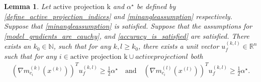 \documentclass{article}
\newtheorem{lemma}[theorem]{Lemma}
\theoremstyle{case}
\numberwithin{theorem}{subsection}
\newcommand{\gmcik}{{\nabla m_{c_i}^{(k)}\left(\xk\right)}}
\newcommand{\gmcil}{{\nabla m_{c_i}^{(l)}\left(\xl\right)}}
\newcommand{\minanglealpha}{{ \alpha^{\star} }}
\newcommand{\naturals}{\mathbb N}
\newcommand{\Rn}{\mathbb R^n}
\newcommand{\xk}{x^{(k)}}
\newcommand{\xl}{{x^{(l)}}}
\newcommand{\activeprojk}{{\textrm{active projection k}}}
\newcommand{\activeprojl}{{active projection l}}
\begin{document}
\begin{lemma}
\label{here_she_is}
Let $\activeprojk$ and $\minanglealpha$ be defined by \cref{define_active_projection_indices} and \cref{minangleassumption} respectively.
Suppose that \cref{minangleassumption} is satisfied.
Suppose that the assumptions for \cref{model_gradients_are_cauchy}, and \cref{accuracy_is_satisfied} are satisfied.
There exists an $k_0 \in \naturals$, such that for any $k, l \ge k_0$, there exists a unit vector $u_f^{(k,l)} \in \Rn$ such that for any 
$i \in \activeprojk \cup \activeprojl$
both 
\begin{align*}
\left(\gmcik\right)^T u_f^{(k,l)} \ge \frac 1 2 \minanglealpha
\quad \textrm{and} \quad
\left(\gmcil\right)^T u_f^{(k,l)} \ge \frac 1 2 \minanglealpha.
\end{align*}
\end{lemma}
\end{document}
